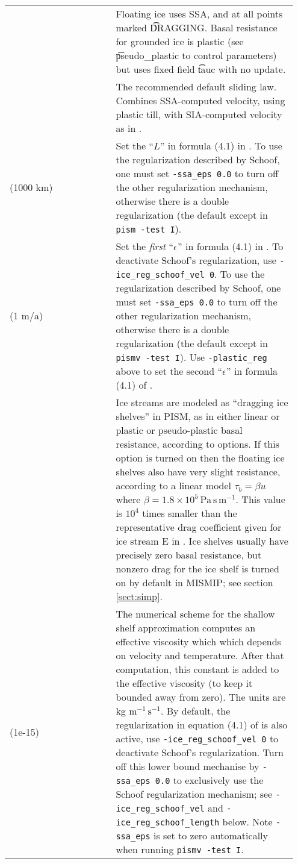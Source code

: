 \begin{center}
  \begin{xtabular}{p{0.35\linewidth}p{0.6\linewidth}}
    \label{tab:ssausage} 
     & Floating ice uses SSA, and at all points marked \t{DRAGGING}. Basal resistance for grounded ice is plastic (see \t{pseudo_plastic} to control parameters) but uses fixed field \t{tauc} with no update. \\
 & The recommended default sliding law.  Combines SSA-computed velocity, using plastic till, with SIA-computed velocity as in \cite{BBssasliding}. \\
 (1000 km) & Set the ``$L$'' in formula (4.1) in \cite{SchoofStream}.  To use the regularization described by Schoof, one must set \texttt{-ssa_eps 0.0} to turn off the other regularization mechanism, otherwise there is a double regularization (the default except in \texttt{pism -test I}). \\
 (1 m/a) & Set the \emph{first} ``$\epsilon$'' in formula (4.1) in \cite{SchoofStream}.  To deactivate Schoof's regularization, use \texttt{-ice_reg_schoof_vel 0}.  To use the regularization described by Schoof, one must set \texttt{-ssa_eps 0.0} to turn off the other regularization mechanism, otherwise there is a double regularization (the default except in \texttt{pismv -test I}).  Use \texttt{-plastic_reg} above to set the second ``$\epsilon$'' in formula (4.1) of \cite{SchoofStream}. \\
 & Ice streams are modeled as ``dragging ice shelves'' in PISM, as in either linear \cite{MacAyeal} or plastic \cite{SchoofStream} or pseudo-plastic basal resistance, according to options.  If this option is turned on then the floating ice shelves also have very slight resistance, according to a linear model $\tau_b = \beta u$ where $\beta = 1.8\times 10^5\, \text{Pa}\,\text{s}\,\text{m}^{-1}$.  This value is $10^4$ times smaller than the representative drag coefficient given for ice stream E in \cite{HulbeMacAyeal}.  Ice shelves usually have precisely zero basal resistance, but nonzero drag for the ice shelf is turned on by default in MISMIP; see section \ref{sect:simp}. \\
 (1e-15) & The numerical scheme for the shallow shelf approximation  \cite{WeisGreveHutter} computes an effective viscosity which which depends on velocity and temperature.  After that computation, this constant is added to the effective viscosity (to keep it bounded away from zero).  The units are kg $\text{m}^{-1}\,\text{s}^{-1}$.  By default, the regularization in equation (4.1) of \cite{SchoofStream} is also active, use \texttt{-ice_reg_schoof_vel 0} to deactivate Schoof's regularization. Turn off this lower bound mechanise by \texttt{-ssa_eps 0.0} to exclusively use the Schoof regularization mechanism; see \texttt{-ice_reg_schoof_vel} and \texttt{-ice_reg_schoof_length} below.  Note \texttt{-ssa_eps} is set to zero automatically when running \texttt{pismv -test I}. \\

\end{xtabular}
\end{center}
